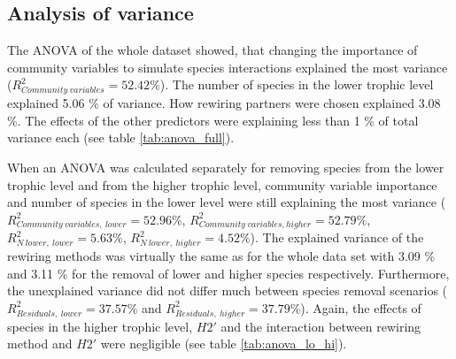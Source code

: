 \documentclass[12pt,a4paper]{article}
\begin{document}
\subsection{Analysis of variance}
The ANOVA of the whole dataset showed, that changing the importance of community variables to simulate species interactions explained the most variance ($ R^2_{Community\: variables} = 52.42 \% $). The number of species in the lower trophic level explained 5.06 \% of variance. How rewiring partners were chosen explained 3.08 \%. The effects of the other predictors were explaining less than 1 \% of total variance each (see table \ref{tab:anova_full}).

When an ANOVA was calculated separately for removing species from the lower trophic level and from the higher trophic level, community variable importance and number of species in the lower level were still explaining the most variance ($ R^2_{Community\: variables,\: lower} = 52.96 \% $, $ R^2_{Community\: variables, higher} = 52.79 \% $, $ R^2_{N\:lower,\: lower} = 5.63 \% $, $ R^2_{N\:lower,\: higher} = 4.52 \% $). The explained variance of the rewiring methods was virtually the same as for the whole data set with 3.09 \% and 3.11 \% for the removal of lower and higher species respectively. Furthermore, the unexplained variance did not differ much between species removal scenarios ($ R^2_{Residuals,\: lower} = 37.57 \% $ and $ R^2_{Residuals,\: higher} = 37.79 \% $). Again, the effects of species in the higher trophic level, $H2'$ and the interaction between rewiring method and $H2'$ were negligible (see table \ref{tab:anova_lo_hi}). \paragraph{}
\end{document}
